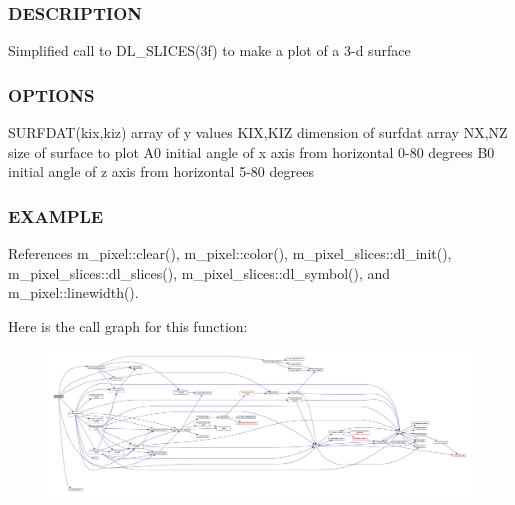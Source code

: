 \subsubsection*{D\+E\+S\+C\+R\+I\+P\+T\+I\+ON}

Simplified call to D\+L\+\_\+\+S\+L\+I\+C\+E\+S(3f) to make a plot of a 3-\/d surface

\subsubsection*{O\+P\+T\+I\+O\+NS}

S\+U\+R\+F\+D\+A\+T(kix,kiz) array of y values K\+IX,K\+IZ dimension of surfdat array NX,NZ size of surface to plot A0 initial angle of x axis from horizontal 0-\/80 degrees B0 initial angle of z axis from horizontal 5-\/80 degrees

\subsubsection*{E\+X\+A\+M\+P\+LE}

References m\+\_\+pixel\+::clear(), m\+\_\+pixel\+::color(), m\+\_\+pixel\+\_\+slices\+::dl\+\_\+init(), m\+\_\+pixel\+\_\+slices\+::dl\+\_\+slices(), m\+\_\+pixel\+\_\+slices\+::dl\+\_\+symbol(), and m\+\_\+pixel\+::linewidth().

Here is the call graph for this function\+:
\nopagebreak
\begin{figure}[H]
\begin{center}
\leavevmode
\includegraphics[width=350pt]{pixel__slice_8f90_a8113cc3f9dd0449a8e74ef4ae1dfe829_cgraph}
\end{center}
\end{figure}
